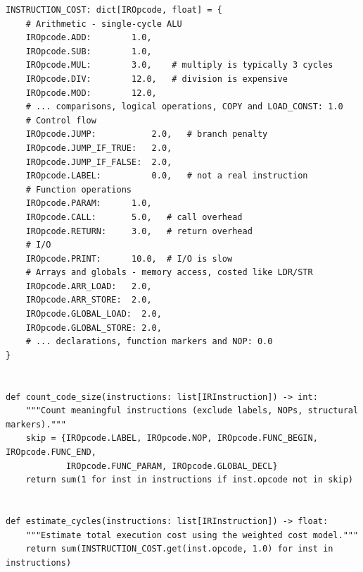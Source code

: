 \begin{lstlisting}[style=snippet]
INSTRUCTION_COST: dict[IROpcode, float] = {
    # Arithmetic - single-cycle ALU
    IROpcode.ADD:        1.0,
    IROpcode.SUB:        1.0,
    IROpcode.MUL:        3.0,    # multiply is typically 3 cycles
    IROpcode.DIV:        12.0,   # division is expensive
    IROpcode.MOD:        12.0,
    # ... comparisons, logical operations, COPY and LOAD_CONST: 1.0
    # Control flow
    IROpcode.JUMP:           2.0,   # branch penalty
    IROpcode.JUMP_IF_TRUE:   2.0,
    IROpcode.JUMP_IF_FALSE:  2.0,
    IROpcode.LABEL:          0.0,   # not a real instruction
    # Function operations
    IROpcode.PARAM:      1.0,
    IROpcode.CALL:       5.0,   # call overhead
    IROpcode.RETURN:     3.0,   # return overhead
    # I/O
    IROpcode.PRINT:      10.0,  # I/O is slow
    # Arrays and globals - memory access, costed like LDR/STR
    IROpcode.ARR_LOAD:   2.0,
    IROpcode.ARR_STORE:  2.0,
    IROpcode.GLOBAL_LOAD:  2.0,
    IROpcode.GLOBAL_STORE: 2.0,
    # ... declarations, function markers and NOP: 0.0
}


def count_code_size(instructions: list[IRInstruction]) -> int:
    """Count meaningful instructions (exclude labels, NOPs, structural markers)."""
    skip = {IROpcode.LABEL, IROpcode.NOP, IROpcode.FUNC_BEGIN, IROpcode.FUNC_END,
            IROpcode.FUNC_PARAM, IROpcode.GLOBAL_DECL}
    return sum(1 for inst in instructions if inst.opcode not in skip)


def estimate_cycles(instructions: list[IRInstruction]) -> float:
    """Estimate total execution cost using the weighted cost model."""
    return sum(INSTRUCTION_COST.get(inst.opcode, 1.0) for inst in instructions)
\end{lstlisting}

